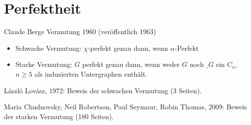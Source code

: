 \chapter{Perfektheit}


Claude Berge Vermutung 1960 (veröffentlich 1963)
\begin{itemize}
    \item
        Schwache Vermutung: $\chi$-perfekt genau dann, wenn $\alpha$-Perfekt
    \item
        Starke Vermutung: $G$ perfekt genau dann, wenn weder $G$ noch $\_G$ ein $C_n$, $n \ge 5$ als induzierten Untergraphen enthält.
\end{itemize}

László Lovász, 1972: Beweis der schwachen Vermutung (3 Seiten).

Maria Chudnovsky, Neil Robertson, Paul Seymaur, Robin Thomas, 2009: Beweis der starken Vermutung (180 Seiten).


